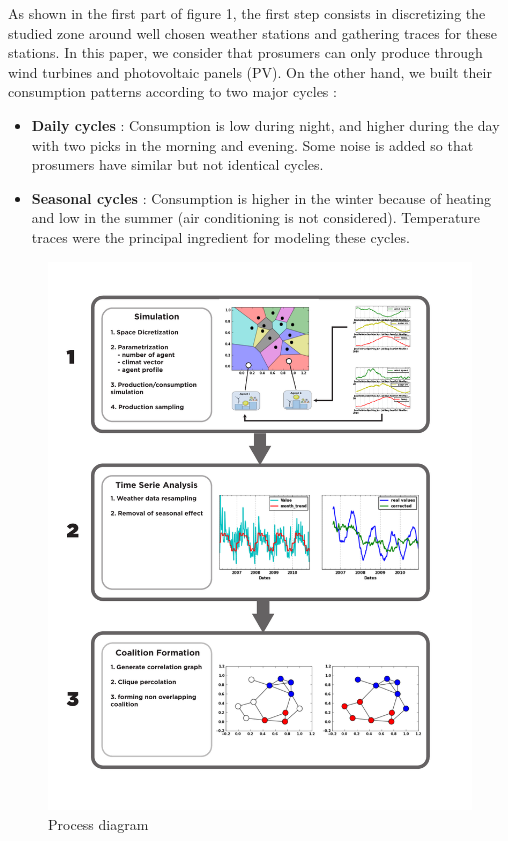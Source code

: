 \documentclass[conference]{IEEEtran}
\begin{document}
As shown in the first part of figure 1, the first step consists in discretizing the studied zone around well chosen weather stations and gathering traces for these stations. In this paper, we consider that prosumers can only produce through wind turbines and photovoltaic panels (PV). On the other hand, we built their consumption patterns according to two major cycles :
\begin{itemize}
\item \textbf{Daily cycles} : Consumption is low during night, and higher during the day with two picks in the morning and evening. Some noise is added so that prosumers have similar but not identical cycles.
\item \textbf{Seasonal cycles} : Consumption is higher in the winter because of heating and low in the summer (air conditioning is not considered). Temperature traces were the principal ingredient for modeling these cycles.
\end{itemize} 

\begin{center}
\begin{figure}
\includegraphics[scale=0.45]{figure2/Fig2}
\caption{Process diagram}
\label{Fig1}
\end{figure}
\end{center}
\end{document}

